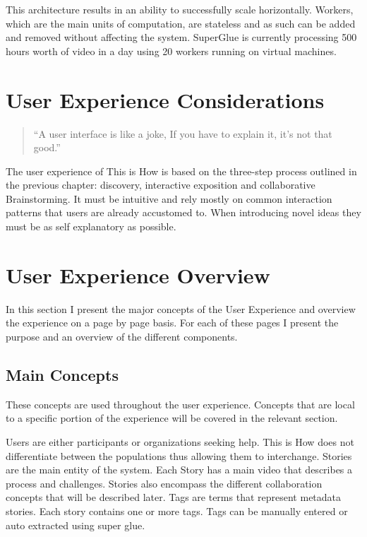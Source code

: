This architecture results in an ability to successfully scale horizontally. Workers, which are the main units of computation, are stateless and as such can be added and removed without affecting the system. SuperGlue is currently processing 500 hours worth of video in a day using 20 workers running on virtual machines.

\section{User Experience Considerations} 

\begin{quotation}
``A user interface is like a joke, If you have to explain it, it's not that good.''
\end{quotation}


The user experience of This is How is based on the three-step process outlined in the previous chapter: discovery, interactive exposition and collaborative Brainstorming. It must be intuitive and rely mostly on common interaction patterns that users are already accustomed to. When introducing novel ideas they must be as self explanatory as possible. 

\section{User Experience Overview}

In this section I present the major concepts of the User Experience and overview the experience on a page by page basis. For each of these pages I present the purpose and an overview of the different components. 

\subsection{Main Concepts}

These concepts are used throughout the user experience. Concepts that are local to a specific portion of the experience will be covered in the relevant section.

Users are either participants or organizations seeking help. This is How does not differentiate between the populations thus allowing them to interchange.
Stories are the main entity of the system. Each Story has a main video that describes a process and challenges. Stories also encompass the different collaboration concepts that will be described later.
Tags are terms that represent metadata stories. Each story contains one or more tags. Tags can be manually entered or auto extracted using super glue. 

